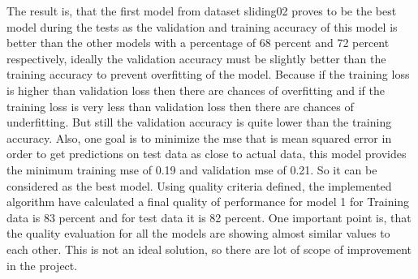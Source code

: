 \begin{table}
\centering
{}
\caption{ Quality Model for models with different hidden units for dataset sliding03}
\label{table:qualitymodelregression2}
\end{table}

The result is, that the first model from dataset sliding02 proves to be the best model during the tests as the  validation and training accuracy of this model is better than the other models with a percentage of 68 percent and 72 percent respectively, ideally the validation accuracy must be slightly better than the training accuracy to prevent overfitting of the model. Because if the training loss is higher than validation loss then there are chances of overfitting and if the training loss is very less than validation loss then there are chances of underfitting. But still the validation accuracy is quite lower than the training accuracy.\newline
Also, one goal is to minimize the mse that is mean squared error in order to get predictions on test data as close to actual data, this model provides the minimum training mse of 0.19 and validation mse of 0.21. So it can be considered as the best model.\newline
Using quality criteria defined, the implemented algorithm have calculated a final quality of performance for model 1 for Training data is 83 percent and for test data it is 82 percent. One important point is, that the quality evaluation for all the models are showing almost similar values to each other. This is not an ideal solution, so there are lot of scope of improvement in the project.\newline

